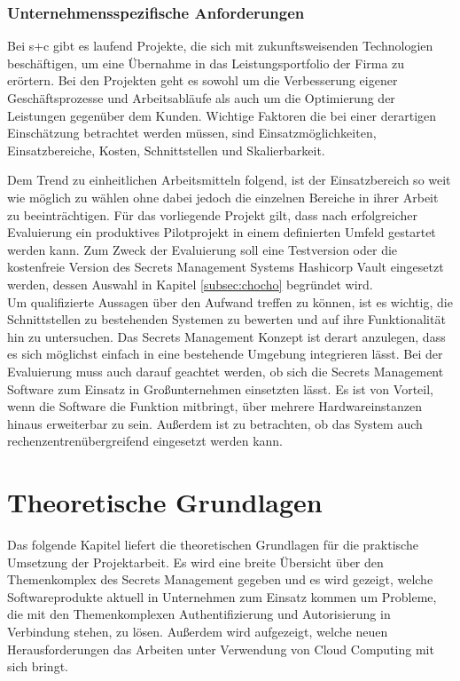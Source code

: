 \documentclass[
book,
a4paper,   
titlepage,  
halfparskip,
12pt        
]{scrartcl}
\begin{document}
\begin{onehalfspacing}
\subsubsection{Unternehmensspezifische Anforderungen}
Bei s+c gibt es laufend Projekte, die sich mit zukunftsweisenden Technologien beschäftigen, um eine Übernahme in das Leistungsportfolio der Firma zu erörtern. Bei den Projekten geht es sowohl um die Verbesserung eigener Geschäftsprozesse und Arbeitsabläufe als auch um die Optimierung der Leistungen gegenüber dem Kunden. Wichtige Faktoren die bei einer derartigen Einschätzung betrachtet werden müssen, sind Einsatzmöglichkeiten, Einsatzbereiche, Kosten, Schnittstellen und Skalierbarkeit. 
                                                                                                          
Dem Trend zu einheitlichen Arbeitsmitteln folgend, ist der Einsatzbereich so weit wie möglich zu wählen ohne dabei jedoch die einzelnen Bereiche in ihrer Arbeit zu beeinträchtigen. Für das vorliegende Projekt gilt, dass nach erfolgreicher Evaluierung ein produktives Pilotprojekt in einem definierten Umfeld gestartet werden kann. Zum Zweck der Evaluierung soll eine Testversion oder die kostenfreie Version des Secrets Management Systems Hashicorp Vault eingesetzt werden, dessen Auswahl in Kapitel \vref{subsec:chocho} begründet wird.\\
Um qualifizierte Aussagen über den Aufwand treffen zu können, ist es wichtig, die Schnittstellen zu bestehenden Systemen zu bewerten und auf ihre Funktionalität hin zu untersuchen. Das Secrets Management Konzept ist derart anzulegen, dass es sich möglichst einfach in eine bestehende Umgebung integrieren lässt. Bei der Evaluierung muss auch darauf geachtet werden, ob sich die Secrets Management Software zum Einsatz in Großunternehmen einsetzten lässt. Es ist von Vorteil, wenn die Software die Funktion mitbringt, über mehrere Hardwareinstanzen hinaus erweiterbar zu sein. Außerdem ist zu betrachten, ob das System auch rechenzentrenübergreifend eingesetzt werden kann.

\newpage
\section{Theoretische Grundlagen}
\label{sec:grund}
Das folgende Kapitel liefert die theoretischen Grundlagen für die praktische Umsetzung der Projektarbeit. Es wird eine breite Übersicht über den Themenkomplex des Secrets Management gegeben und es wird gezeigt, welche Softwareprodukte aktuell in Unternehmen zum Einsatz kommen um Probleme, die mit den Themenkomplexen Authentifizierung und Autorisierung in Verbindung stehen, zu lösen. Außerdem wird aufgezeigt, welche neuen Herausforderungen das Arbeiten unter Verwendung von Cloud Computing mit sich bringt. 


\end{onehalfspacing}
\end{document}
